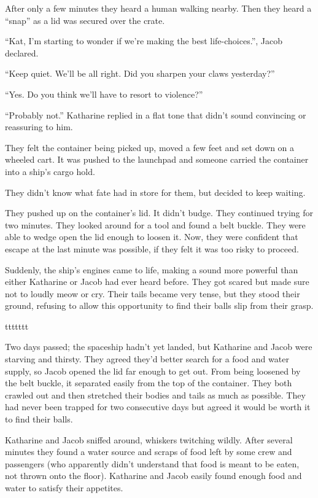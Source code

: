 After only a few minutes they heard a human walking nearby. Then they heard a “snap” as a lid was secured over the crate.

“Kat, I'm starting to wonder if we're making the best life-choices.”, Jacob declared.

“Keep quiet. We'll be all right. Did you sharpen your claws yesterday?”

“Yes. Do you think we'll have to resort to violence?”

“Probably not.” Katharine replied in a flat tone that didn't sound convincing or reassuring to him.

They felt the container being picked up, moved a few feet and set down on a wheeled cart. It was pushed to the launchpad and someone carried the container into a ship's cargo hold.

They didn't know what fate had in store for them, but decided to keep waiting.

They pushed up on the container's lid. It didn't budge. They continued trying for two minutes. They looked around for a tool and found a belt buckle. They were able to wedge open the lid enough to loosen it. Now, they were confident that escape at the last minute was possible, if they felt it was too risky to proceed.

Suddenly, the ship's engines came to life, making a sound more powerful than either Katharine or Jacob had ever heard before. They got scared but made sure not to loudly meow or cry. Their tails became very tense, but they stood their ground, refusing to allow this opportunity to find their balls slip from their grasp. %



ttttttt



Two days passed; the spaceship hadn't yet landed, but Katharine and Jacob were starving and thirsty. They agreed they'd better search for a food and water supply, so Jacob opened the lid far enough to get out. From being loosened by the belt buckle, it separated easily from the top of the container. They both crawled out and then stretched their bodies and tails as much as possible. They had never been trapped for two consecutive days but agreed it would be worth it to find their balls.

Katharine and Jacob sniffed around, whiskers twitching wildly. After several minutes they found a water source and scraps of food left by some crew and passengers (who apparently didn't understand that food is meant to be eaten, not thrown onto the floor). Katharine and Jacob easily found enough food and water to satisfy their appetites.

